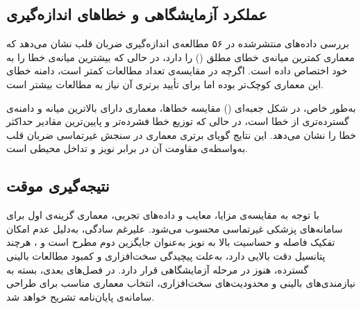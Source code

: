 \subsection{عملکرد آزمایشگاهی و خطاهای اندازه‌گیری}
\label{sec:experimental-performance}

بررسی داده‌های منتشرشده در ۵۶ مطالعه‌ی اندازه‌گیری ضربان قلب نشان می‌دهد که معماری  کمترین میانه‌ی خطای مطلق () را دارد، در حالی که  بیشترین میانه‌ی خطا را به خود اختصاص داده است. اگرچه  در مقایسه‌ی تعداد مطالعات کمتر است، دامنه خطای این معماری کوچک‌تر بوده اما برای تأیید برتری آن نیاز به مطالعات بیشتر است.

به‌طور خاص، در شکل جعبه‌ای () مقایسه خطاها، معماری  دارای بالاترین میانه و دامنه‌ی گسترده‌تری از خطا است، در حالی که  توزیع خطا فشرده‌تر و  پایین‌ترین مقادیر حداکثر خطا را نشان می‌دهد. این نتایج گویای برتری معماری  در سنجش غیرتماسی ضربان قلب به‌واسطه‌ی مقاومت آن در برابر نویز و تداخل محیطی است.

\subsection{نتیجه‌گیری موقت}
\label{sec:interim-conclusion}

با توجه به مقایسه‌ی مزایا، معایب و داده‌های تجربی، معماری  گزینه‌ی اول برای سامانه‌های پزشکی غیرتماسی محسوب می‌شود.  علیرغم سادگی، به‌دلیل عدم امکان تفکیک فاصله و حساسیت بالا به نویز به‌عنوان جایگزین دوم مطرح است و ، هرچند پتانسیل دقت بالایی دارد، به‌علت پیچیدگی سخت‌افزاری و کمبود مطالعات بالینی گسترده، هنوز در مرحله آزمایشگاهی قرار دارد. در فصل‌های بعدی، بسته به نیازمندی‌های بالینی و محدودیت‌های سخت‌افزاری، انتخاب معماری مناسب برای طراحی سامانه‌ی پایان‌نامه تشریح خواهد شد.
